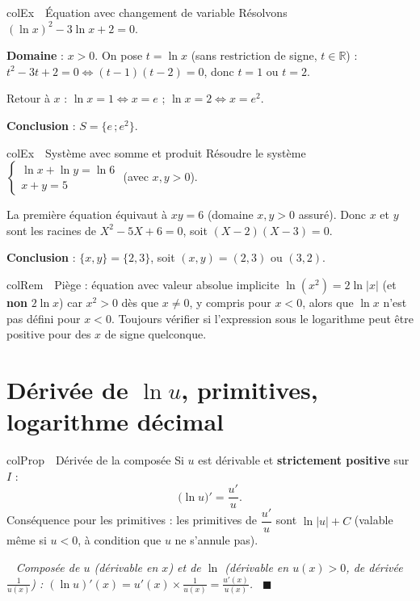 \documentclass[11pt,a4paper]{article}
\newenvironment{propriete}[1][Propriété]
  {\begin{fiche}{colProp}{\ding{72}~~#1}}{\end{fiche}}
\newenvironment{exemple}[1][Exemple]
  {\begin{fiche}{colEx}{\ding{217}~~#1}}{\end{fiche}}
\newenvironment{remarque}[1][Remarque]
  {\begin{fiche}{colRem}{\ding{43}~~#1}}{\end{fiche}}
\newenvironment{demo}
  {\par\smallskip\noindent{\sffamily\bfseries\color{qtealdark}Démonstration.}\ \itshape}
  {\ \normalfont\hfill$\blacksquare$\par\medskip}
\begin{document}
\begin{exemple}[Équation avec changement de variable]
Résolvons $(\ln x)^2 - 3\ln x + 2 = 0$.

\smallskip
\textbf{Domaine} : $x>0$. On pose $t=\ln x$ (sans restriction de signe, $t\in\mathbb{R}$) : $t^2-3t+2=0 \iff (t-1)(t-2)=0$, donc $t=1$ ou $t=2$.

\smallskip
Retour à $x$ : $\ln x=1 \iff x=e$ ; $\ln x=2 \iff x=e^2$.

\smallskip
\textbf{Conclusion} : $S=\{e\,;e^2\}$.
\end{exemple}

\begin{exemple}[Système avec somme et produit]
Résoudre le système $\begin{cases} \ln x + \ln y = \ln 6 \\ x + y = 5 \end{cases}$ (avec $x,y>0$).

\smallskip
La première équation équivaut à $xy = 6$ (domaine $x,y>0$ assuré). Donc $x$ et $y$ sont les racines de $X^2 - 5X + 6 = 0$, soit $(X-2)(X-3)=0$.

\smallskip
\textbf{Conclusion} : $\{x,y\}=\{2,3\}$, soit $(x,y)=(2,3)$ ou $(3,2)$.
\end{exemple}

\begin{remarque}[Piège : équation avec valeur absolue implicite]
$\ln(x^2) = 2\ln|x|$ (et \textbf{non} $2\ln x$) car $x^2>0$ dès que $x\neq0$, y compris pour $x<0$, alors que $\ln x$ n'est pas défini pour $x<0$. Toujours vérifier si l'expression sous le logarithme peut être positive pour des $x$ de signe quelconque.
\end{remarque}

\section{Dérivée de $\ln u$, primitives, logarithme décimal}

\begin{propriete}[Dérivée de la composée]
Si $u$ est dérivable et \textbf{strictement positive} sur $I$ :
\[
  \bigl(\ln u\bigr)' = \frac{u'}{u}.
\]
Conséquence pour les primitives : les primitives de $\dfrac{u'}{u}$ sont $\ln|u| + C$ (valable même si $u<0$, à condition que $u$ ne s'annule pas).
\end{propriete}

\begin{demo}
Composée de $u$ (dérivable en $x$) et de $\ln$ (dérivable en $u(x) > 0$, de dérivée $\frac{1}{u(x)}$) : $(\ln u)'(x) = u'(x)\times\frac{1}{u(x)} = \frac{u'(x)}{u(x)}$.
\end{demo}
\end{document}

